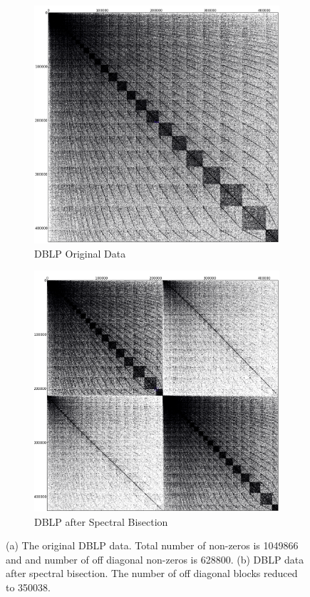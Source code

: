 \documentclass[11pt]{article}
\begin{document}
\begin{figure}
\centering
\begin{subfigure}{.5\textwidth}
	\centering
	\includegraphics[width=.9\linewidth]{figs/DBLP_Original.png}
	\caption{DBLP Original Data}
	\label{fig:DBLP}
\end{subfigure}%
\begin{subfigure}{.5\textwidth}
		\centering
		\includegraphics[width=.9\linewidth]{figs/DBLP_SBC0.png}
		\caption{DBLP after Spectral Bisection}
		\label{fig:DBLP_SB_C0}
	\end{subfigure}
	\caption{ (a) The original DBLP data. Total number of
non-zeros is 1049866 and and number of off diagonal non-zeros is 628800. (b)
DBLP data after spectral bisection. The number of off diagonal blocks
reduced to 350038. } 
	\label{fig:DBLPSB}
\end{figure}
\end{document}

